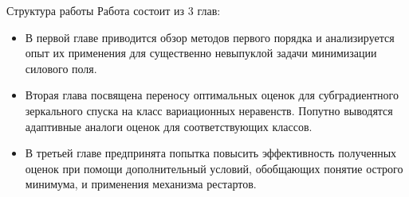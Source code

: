 \begin{frame}
    \setcounter{framenumber}{1}
    \maketitle
\end{frame}

\begin{frame}{Структура работы}
    Работа состоит из 3 глав:
    \begin{itemize}
        \item В первой главе приводится обзор методов первого порядка и анализируется опыт их применения для существенно невыпуклой задачи минимизации силового поля. 
        \item Вторая глава посвящена переносу оптимальных оценок для субградиентного зеркального спуска на класс вариационных неравенств. Попутно выводятся адаптивные аналоги оценок для соответствующих классов.
        \item В третьей главе предпринята попытка повысить эффективность полученных оценок при помощи дополнительный условий, обобщающих понятие острого минимума, и применения механизма рестартов.
    \end{itemize}
\end{frame}
